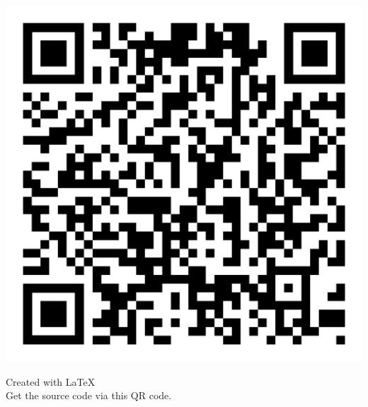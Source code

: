 \documentclass[compress,dvipsnames]{beamer}
\begin{document}
\begin{columns}[T]
\begin{flushleft}
\begin{column}{0.125\textwidth}
\begin{minipage}[t]{0.85\textwidth}
                \includegraphics[scale=0.075]{QR_Code_Git_Link.png}

                Created with \LaTeX\\
                Get the source code via this QR code.
            \end{minipage}
        \end{column}
    \end{flushleft}
\end{columns}
\end{document}
